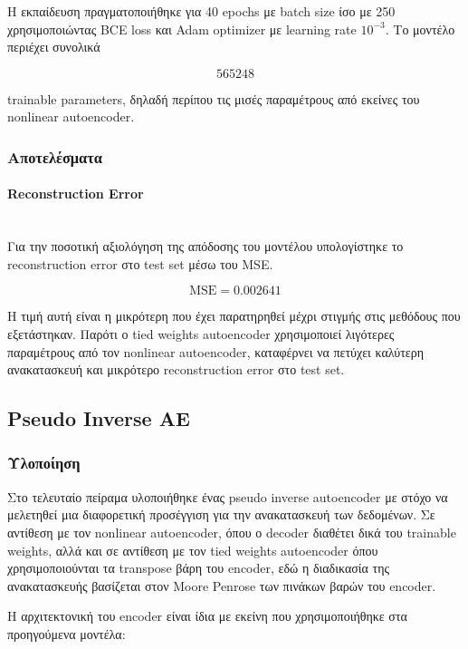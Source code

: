 \documentclass[12pt]{article}
\begin{document}
Η εκπαίδευση πραγματοποιήθηκε για 40 epochs με batch size ίσο με 250 χρησιμοποιώντας BCE loss και Adam optimizer με learning rate $10^{-3}$. 
Το μοντέλο περιέχει συνολικά

\begin{equation}
565248
\end{equation}

trainable parameters, δηλαδή περίπου τις μισές παραμέτρους από εκείνες του nonlinear autoencoder.

\subsubsection{Αποτελέσματα}
\paragraph{Reconstruction Error}
\mbox{}\\
Για την ποσοτική αξιολόγηση της απόδοσης του μοντέλου υπολογίστηκε το reconstruction error στο test set μέσω του MSE.

\begin{equation}
\mathrm{MSE}=0.002641
\end{equation}

Η τιμή αυτή είναι η μικρότερη που έχει παρατηρηθεί μέχρι στιγμής στις μεθόδους που εξετάστηκαν. Παρότι ο tied weights autoencoder χρησιμοποιεί 
λιγότερες παραμέτρους από τον nonlinear autoencoder, καταφέρνει να πετύχει καλύτερη ανακατασκευή και μικρότερο reconstruction error στο test set.



\subsection{Pseudo Inverse AE}
\subsubsection{Υλοποίηση}
Στο τελευταίο πείραμα υλοποιήθηκε ένας pseudo inverse autoencoder με στόχο να μελετηθεί μια διαφορετική προσέγγιση για την ανακατασκευή των δεδομένων. 
Σε αντίθεση με τον nonlinear autoencoder, όπου ο decoder διαθέτει δικά του trainable weights, αλλά και σε αντίθεση με τον tied weights autoencoder 
όπου χρησιμοποιούνται τα transpose βάρη του encoder, εδώ η διαδικασία της ανακατασκευής βασίζεται στον Moore Penrose των 
πινάκων βαρών του encoder.

Η αρχιτεκτονική του encoder είναι ίδια με εκείνη που χρησιμοποιήθηκε στα προηγούμενα μοντέλα:
\end{document}
